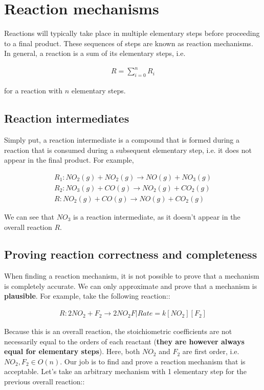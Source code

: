 \documentclass[12pt]{book}
\begin{document}
\section*{Reaction mechanisms}
Reactions will typically take place in multiple elementary steps before proceeding to a final product. These sequences of steps are known as reaction mechanisms. In general, a reaction is a sum of its elementary steps, i.e.

\begin{align*}
    R=\sum_{i=0}^{n} R_i
\end{align*}

for a reaction with $n$ elementary steps.

\subsection*{Reaction intermediates}
Simply put, a reaction intermediate is a compound that is formed during a reaction that is consumed during a subsequent elementary step, i.e. it does not appear in the final product. For example,

\begin{align}
    R_1:NO_2(g)+NO_2(g)\rightarrow NO(g)+NO_3(g)\\
    R_2:NO_3(g)+CO(g)\rightarrow NO_2(g)+CO_2(g)\\
    R: NO_2(g)+CO(g)\rightarrow NO(g)+CO_2(g)
\end{align}

We can see that $NO_3$ is a reaction intermediate, as it doesn't appear in the overall reaction $R$.

\subsection*{Proving reaction correctness and completeness}

When finding a reaction mechanism, it is not possible to prove that a mechanism is completely accurate. We can only approximate and prove that a mechanism is \textbf{plausible}. For example, take the following reaction::

\begin{align*}
    R: 2NO_2+F_2\rightarrow 2NO_2F|Rate=k[NO_2][F_2]
\end{align*}

Because this is an overall reaction, the stoichiometric coefficients are not necessarily equal to the orders of each reactant (\textbf{they are however always equal for elementary steps}). Here, both $NO_2$ and $F_2$ are first order, i.e. $NO_2,F_2\in O(n)$. Our job is to find and prove a reaction mechanism that is acceptable. Let's take an arbitrary mechanism with 1 elementary step for the previous overall reaction::
\end{document}
